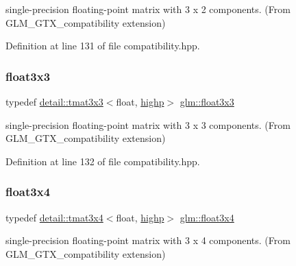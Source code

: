 single-\/precision floating-\/point matrix with 3 x 2 components. (From G\+L\+M\+\_\+\+G\+T\+X\+\_\+compatibility extension) 



Definition at line 131 of file compatibility.\+hpp.

\mbox{\label{group__gtx__compatibility_ga11458ecd63c32b7e502d90091a6d0a6c}} 
\subsubsection{\texorpdfstring{float3x3}{float3x3}}
{\footnotesize\ttfamily typedef \hyperlink{structglm_1_1detail_1_1tmat3x3}{detail\+::tmat3x3}$<$float, \hyperlink{namespaceglm_a0f04f086094c747d227af4425893f545ac6f7eab42eacbb10d59a58e95e362074}{highp}$>$ \hyperlink{group__gtx__compatibility_ga11458ecd63c32b7e502d90091a6d0a6c}{glm\+::float3x3}}



single-\/precision floating-\/point matrix with 3 x 3 components. (From G\+L\+M\+\_\+\+G\+T\+X\+\_\+compatibility extension) 



Definition at line 132 of file compatibility.\+hpp.

\mbox{\label{group__gtx__compatibility_ga53eb75b08b92aa34886397150c983943}} 
\subsubsection{\texorpdfstring{float3x4}{float3x4}}
{\footnotesize\ttfamily typedef \hyperlink{structglm_1_1detail_1_1tmat3x4}{detail\+::tmat3x4}$<$float, \hyperlink{namespaceglm_a0f04f086094c747d227af4425893f545ac6f7eab42eacbb10d59a58e95e362074}{highp}$>$ \hyperlink{group__gtx__compatibility_ga53eb75b08b92aa34886397150c983943}{glm\+::float3x4}}



single-\/precision floating-\/point matrix with 3 x 4 components. (From G\+L\+M\+\_\+\+G\+T\+X\+\_\+compatibility extension) 



